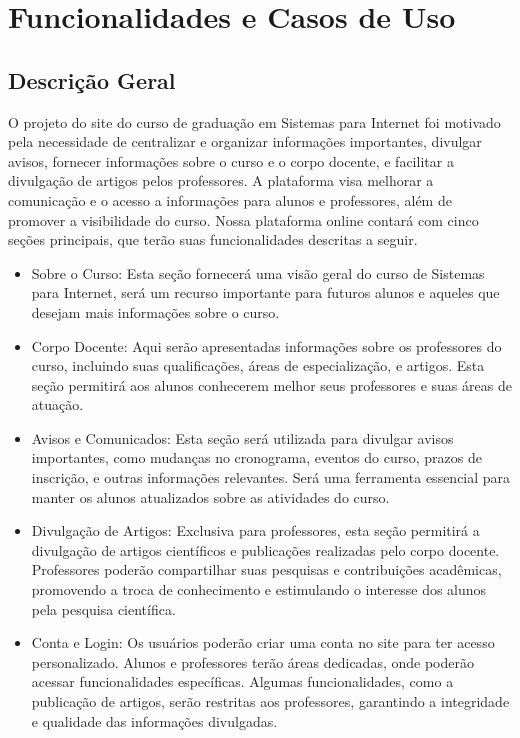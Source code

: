 \documentclass[a4paper,12pt]{report}
\begin{document}
\section{Funcionalidades e Casos de Uso}
 \subsection{Descrição Geral}
    \label{sec:descricao}
O projeto do site do curso de graduação em Sistemas para Internet foi motivado pela necessidade de centralizar e organizar informações importantes, divulgar avisos, fornecer informações sobre o curso e o corpo docente, e facilitar a divulgação de artigos pelos professores. A plataforma visa melhorar a comunicação e o acesso a informações para alunos e professores, além de promover a visibilidade do curso.
Nossa plataforma online contará com cinco seções principais, que terão suas funcionalidades descritas a seguir.
 
\begin{itemize} 
    \item Sobre o Curso: Esta seção fornecerá uma visão geral do curso de Sistemas para Internet, será um recurso importante para futuros alunos e aqueles que desejam mais informações sobre o curso.
 
    \item Corpo Docente: Aqui serão apresentadas informações sobre os professores do curso, incluindo suas qualificações, áreas de especialização, e artigos. Esta seção permitirá aos alunos conhecerem melhor seus professores e suas áreas de atuação.
 
    \item Avisos e Comunicados: Esta seção será utilizada para divulgar avisos importantes, como mudanças no cronograma, eventos do curso, prazos de inscrição, e outras informações relevantes. Será uma ferramenta essencial para manter os alunos atualizados sobre as atividades do curso.
 
    \item Divulgação de Artigos: Exclusiva para professores, esta seção permitirá a divulgação de artigos científicos e publicações realizadas pelo corpo docente. Professores poderão compartilhar suas pesquisas e contribuições acadêmicas, promovendo a troca de conhecimento e estimulando o interesse dos alunos pela pesquisa científica.
 
    \item Conta e Login: Os usuários poderão criar uma conta no site para ter acesso personalizado. Alunos e professores terão áreas dedicadas, onde poderão acessar funcionalidades específicas. Algumas funcionalidades, como a publicação de artigos, serão restritas aos professores, garantindo a integridade e qualidade das informações divulgadas.
\end{itemize}
\end{document}
